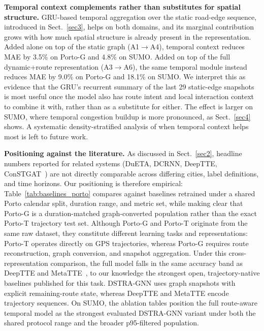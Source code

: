 \textbf{Temporal context complements rather than substitutes for spatial structure.} GRU-based temporal aggregation over the static road-edge sequence, introduced in Sect.~\ref{sec3}, helps on both domains, and its marginal contribution grows with how much spatial structure is already present in the representation. Added alone on top of the static graph (A1$\to$A4), temporal context reduces MAE by 3.5\% on Porto-G and 4.8\% on SUMO. Added on top of the full dynamic+route representation (A3$\to$A6), the same temporal module instead reduces MAE by 9.0\% on Porto-G and 18.1\% on SUMO. We interpret this as evidence that the GRU's recurrent summary of the last 29 static-edge snapshots is most useful once the model also has route intent and local interaction context to combine it with, rather than as a substitute for either. The effect is larger on SUMO, where temporal congestion buildup is more pronounced, as Sect.~\ref{sec4} shows. A systematic density-stratified analysis of when temporal context helps most is left to future work.

\textbf{Positioning against the literature.} As discussed in Sect.~\ref{sec2}, headline numbers reported for related systems (DuETA, DCRNN, DeepTTE, ConSTGAT~\cite{dueta2023,dcrnn2018,deepTTE2018,constgat2020}) are not directly comparable across differing cities, label definitions, and time horizons. Our positioning is therefore empirical: Table~\ref{tab:baselines_porto} compares against baselines retrained under a shared Porto calendar split, duration range, and metric set, while making clear that Porto-G is a duration-matched graph-converted population rather than the exact Porto-T trajectory test set. Although Porto-G and Porto-T originate from the same raw dataset, they constitute different learning tasks and representations: Porto-T operates directly on GPS trajectories, whereas Porto-G requires route reconstruction, graph conversion, and snapshot aggregation. Under this cross-representation comparison, the full model falls in the same accuracy band as DeepTTE and MetaTTE~\cite{wang2022metatte}, to our knowledge the strongest open, trajectory-native baselines published for this task. DSTRA-GNN uses graph snapshots with explicit remaining-route state, whereas DeepTTE and MetaTTE encode trajectory sequences. On SUMO, the ablation tables position the full route-aware temporal model as the strongest evaluated DSTRA-GNN variant under both the shared protocol range and the broader p95-filtered population.

